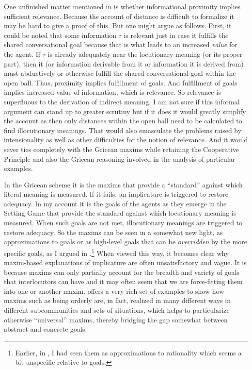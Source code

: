 One unfinished matter mentioned in  is whether informational proximity implies sufficient relevance. Because the account of distance is difficult to formalize it may be hard to give a proof of this. But one might argue as follows. First, it could be noted that some information $\tau$ is relevant just in case it fulfills the shared conversational goal because that is what leads to an increased \emph{value} for the agent. If $\tau$ is already adequately near the locutionary meaning (or its proper part), then it (or information derivable from it or information it is derived from) must abductively or otherwise fulfill the shared conversational goal within the open ball. Thus, proximity implies fulfillment of goals. And fulfillment of goals implies increased value of information, which is relevance. So relevance is superfluous to the derivation of indirect meaning. I am not sure if this informal argument can stand up to greater scrutiny but if it does it would greatly simplify the account as then only distances within the open ball need to be calculated to find illocutionary meanings. That would also emasculate the problems raised by intensionality as well as other difficulties for the notion of relevance. And it would sever ties completely with the Gricean maxims while retaining the Cooperative Principle and also the Gricean reasoning involved in the analysis of particular examples.

In the Gricean scheme it is the maxims that provide a ``standard'' against which literal meaning is measured. If it fails, an implicature is triggered to restore adequacy. In my account it is the goals of the agents as they emerge in the Setting Game that provide the standard against which locutionary meaning is measured. When such goals are not met, illocutionary meanings are triggered to restore adequacy. So the maxims can be seen in a somewhat new light, as approximations to goals or as high-level goals that can be \emph{overridden} by the more specific goals, as I argued in .\footnote{Earlier, in \citet[Section~7.7]{parikh:ul}, I had seen them as approximations to rationality which seems a bit unspecific relative to goals.} When viewed this way, it becomes clear why maxim-based explanations of implicature are often unsatisfactory and vague. It is because maxims can only partially account for the breadth and variety of goals that interlocutors can have and it may often seem that we are force-fitting them into one or another maxim. \citet{horn:tp} offers a very rich set of examples to show how maxims such as being orderly are, in fact, realized in many different ways in different subcommunities and sets of situations, which helps to particularize otherwise ``universal'' maxims, thereby bridging the gap somewhat between abstract and concrete goals.

